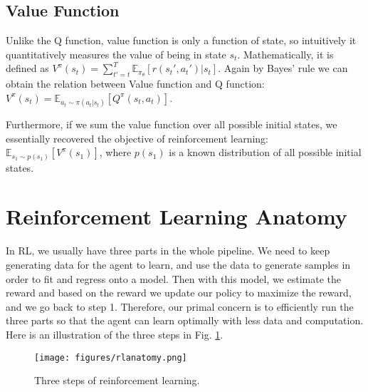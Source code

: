 \subsection{Value Function}
Unlike the Q function, value function is only a function of state, so intuitively it quantitatively measures the value of being in state $s_t$. Mathematically, it is defined as $V^\pi(s_t) =\sum_{t'=t}^T{\mathbb{E}_{\pi_\theta}[r(s_t',a_t')|s_t]}$. Again by Bayes' rule we can obtain the relation between Value function and Q function: $V^\pi(s_t)=\mathbb{E}_{a_t\sim\pi(a_t|s_t)}[Q^\pi(s_t,a_t)]$.

Furthermore, if we sum the value function over all possible initial states, we essentially recovered the objective of reinforcement learning: $\mathbb{E}_{s_1\sim p(s_1)}[V^\pi(s_1)]$, where $p(s_1)$ is a known distribution of all possible initial states.
\section{Reinforcement Learning Anatomy}
In RL, we usually have three parts in the whole pipeline. We need to keep generating data for the agent to learn, and use the data to generate samples in order to fit and regress onto a model. Then with this model, we estimate the reward and based on the reward we update our policy to maximize the reward, and we go back to step 1. Therefore, our primal concern is to efficiently run the three parts so that the agent can learn optimally with less data and computation. Here is an illustration of the three steps in Fig. \ref{fig:rlanatomy}.
\begin{figure}
    \centering
    \texttt{[image: figures/rlanatomy.png]}
    \caption{Three steps of reinforcement learning.}
    \label{fig:rlanatomy}
\end{figure}